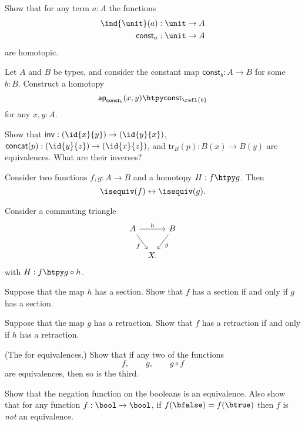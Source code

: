 \begin{exercises}
\item Show that for any term $a:A$ the functions
\begin{align*}
\ind{\unit}(a) & : \unit \to A \\
\mathsf{const}_a & : \unit \to A
\end{align*}
are homotopic.
\item Let $A$ and $B$ be types, and consider the constant map $\mathsf{const}_b:A\to B$ for some $b:B$. Construct a homotopy
\begin{equation*}
\mathsf{ap}_{\mathsf{const}_b}(x,y)\htpy \mathsf{const}_{\refl{b}}
\end{equation*}
for any $x,y:A$.
\item \label{ex:equiv_grpd_ops}Show that $\mathsf{inv}:(\id{x}{y})\to(\id{y}{x})$, $\mathsf{concat}(p):(\id{y}{z})\to(\id{x}{z})$, and $\mathsf{tr}_B(p):B(x)\to B(y)$ are equivalences. What are their inverses?
\item \label{ex:htpy_equiv} Consider two functions $f,g:A\to B$ and a homotopy $H:f\htpy g$. Then
\begin{equation*}
\isequiv(f)\leftrightarrow\isequiv(g).
\end{equation*}
\item \label{ex:3_for_2} 
Consider a commuting triangle
\begin{equation*}
\begin{tikzcd}[column sep=tiny]
A \arrow[rr,"h"] \arrow[dr,swap,"f"] & & B \arrow[dl,"g"] \\
& X.
\end{tikzcd}
\end{equation*}
with $H:f\htpy g\circ h$.
\begin{subexenum}
\item Suppose that the map $h$ has a section. Show that $f$ has a section if and only if $g$ has a section.
\item Suppose that the map $g$ has a retraction. Show that $f$ has a retraction if and only if $h$ has a retraction.
\item (The  for equivalences.) Show that if any two of the functions
\begin{equation*}
f,\qquad g,\qquad g\circ f
\end{equation*}
are equivalences, then so is the third.
\end{subexenum}
\item \label{ex:neg_equiv} Show that the negation function on the booleans is an equivalence. Also show that for any function $f:\bool\to\bool$, if $f(\bfalse)=f(\btrue)$ then $f$ is \emph{not} an equivalence.

\end{exercises}
